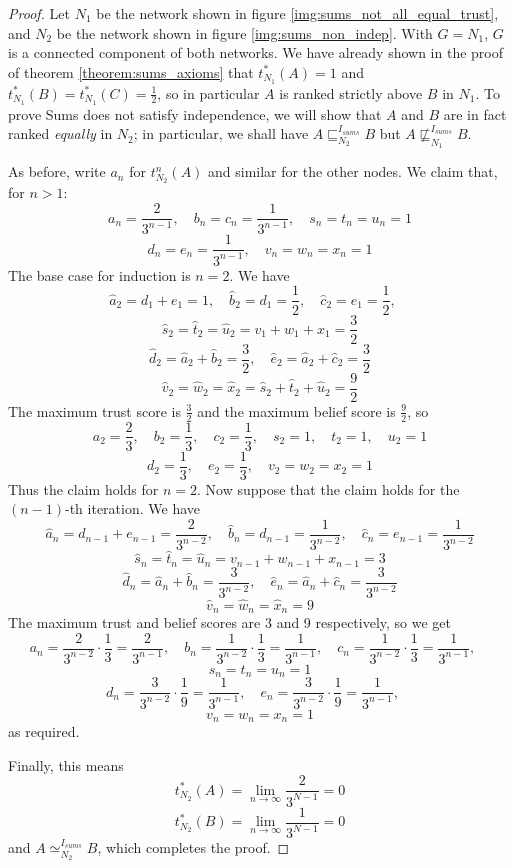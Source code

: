\documentclass{article}
\theoremstyle{definition} \newtheorem{definition}{Definition}
\theoremstyle{definition} \newtheorem{example}{Example}
\theoremstyle{plain} \newtheorem{axiom}{Axiom}
\theoremstyle{plain} \newtheorem*{remark}{Remark}
\theoremstyle{remark} \newtheorem*{notation}{Notation}
\theoremstyle{plain} \newtheorem{lemma}{Lemma}
\theoremstyle{plain} \newtheorem{theorem}{Theorem}
\theoremstyle{plain} \newtheorem{proposition}{Proposition}
\newcommand{\sle}{\sqsubseteq}
\newcommand{\seq}{\simeq}
\begin{document}
\begin{proof}
Let $N_1$ be the network shown in figure \ref{img:sums_not_all_equal_trust},
and $N_2$ be the network shown in figure \ref{img:sums_non_indep}. With
$G=N_1$, $G$ is a connected component of both networks. We have already shown
in the proof of theorem \ref{theorem:sums_axioms} that $t_{N_1}^*(A) = 1$ and
$t_{N_1}^*(B) = t_{N_1}^*(C) = \frac{1}{2}$, so in particular $A$ is ranked
strictly above $B$ in $N_1$. To prove Sums does not satisfy independence, we
will show that $A$ and $B$ are in fact ranked \emph{equally} in $N_2$; in
particular, we shall have $A \sle_{N_2}^{I_{sums}} B$ but $A
\not\sle_{N_1}^{I_{sums}} B$.

As before, write $a_n$ for $t_{N_2}^n(A)$ and similar for the other nodes. We
claim that, for $n > 1$:
\[
    a_n = \frac{2}{3^{n - 1}}, \quad
    b_n = c_n = \frac{1}{3^{n - 1}}, \quad
    s_n = t_n = u_n = 1
\]
\[
    d_n = e_n = \frac{1}{3^{n - 1}}, \quad
    v_n = w_n = x_n = 1
\]
The base case for induction is $n = 2$. We have
\[
    \hat{a}_2 = d_1 + e_1 = 1, \quad
    \hat{b}_2 = d_1 = \frac{1}{2}, \quad
    \hat{c}_2 = e_1 = \frac{1}{2}, \quad
\]
\[
    \hat{s}_2 = \hat{t}_2 = \hat{u}_2 = v_1 + w_1 + x_1
    = \frac{3}{2}
\]
\[
    \hat{d}_2 = \hat{a}_2 + \hat{b}_2 = \frac{3}{2}, \quad
    \hat{e}_2 = \hat{a}_2 + \hat{c}_2 = \frac{3}{2}
\]
\[
    \hat{v}_2 = \hat{w}_2 = \hat{x}_2 = \hat{s}_2 + \hat{t}_2 + \hat{u}_2
    = \frac{9}{2}
\]
The maximum trust score is $\frac{3}{2}$ and the maximum belief score is
$\frac{9}{2}$, so
\[
    a_2 = \frac{2}{3}, \quad
    b_2 = \frac{1}{3}, \quad
    c_2 = \frac{1}{3}, \quad
    s_2 = 1, \quad
    t_2 = 1, \quad
    u_2 = 1
\]
\[
    d_2 = \frac{1}{3}, \quad
    e_2 = \frac{1}{3}, \quad
    v_2 = w_2 = x_2 = 1
\]
Thus the claim holds for $n = 2$. Now suppose that the claim holds for the $(n
- 1)$-th iteration. We have
\[
    \hat{a}_n = d_{n-1} + e_{n-1}
              = \frac{2}{3^{n-2}}, \quad
    \hat{b}_n = d_{n-1}
              = \frac{1}{3^{n-2}}, \quad
    \hat{c}_n = e_{n-1}
              = \frac{1}{3^{n-2}}
\]
\[
    \hat{s}_n = \hat{t}_n = \hat{u}_n
    = v_{n-1} + w_{n-1} + x_{n-1}
    = 3
\]
\[
    \hat{d}_n = \hat{a}_n + \hat{b}_n
              = \frac{3}{3^{n - 2}}, \quad
    \hat{e}_n = \hat{a}_n + \hat{c}_n
              = \frac{3}{3^{n - 2}}
\]
\[
    \hat{v}_n = \hat{w}_n = \hat{x}_n = 9
\]
The maximum trust and belief scores are 3 and 9 respectively, so we get
\[
    a_n = \frac{2}{3^{n-2}}\cdot\frac{1}{3}
        = \frac{2}{3^{n-1}}, \quad
    b_n = \frac{1}{3^{n-2}}\cdot\frac{1}{3}
        = \frac{1}{3^{n-1}}, \quad
    c_n = \frac{1}{3^{n-2}}\cdot\frac{1}{3}
        = \frac{1}{3^{n-1}}, \quad
\]
\[
    s_n = t_n = u_n = 1
\]
\[
    d_n = \frac{3}{3^{n-2}}\cdot\frac{1}{9}
        = \frac{1}{3^{n-1}}, \quad
    e_n = \frac{3}{3^{n-2}}\cdot\frac{1}{9}
        = \frac{1}{3^{n-1}}, \quad
\]
\[
    v_n = w_n = x_n = 1
\]
as required.

Finally, this means
\[ t_{N_2}^*(A) = \lim_{n \rightarrow \infty}\frac{2}{3^{N-1}} = 0 \]
\[ t_{N_2}^*(B) = \lim_{n \rightarrow \infty}\frac{1}{3^{N-1}} = 0 \]
and $A \seq_{N_2}^{I_{sums}} B$, which completes the proof.

\end{proof}

\end{document}
